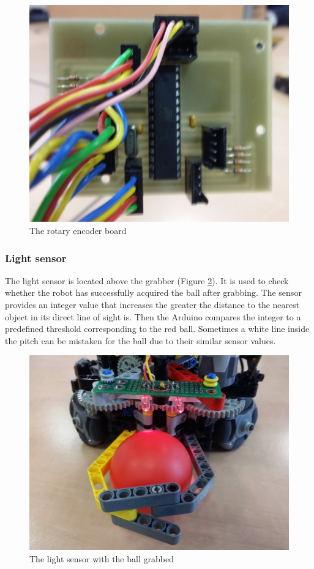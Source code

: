 \documentclass[a4paper,12pt]{article}
\begin{document}
\begin{figure}[ht!]
\centering
\includegraphics[scale=.1]{rotary1}
\caption{The rotary encoder board}
\label{fig:rotary}
\end{figure}

\subsubsection{Light sensor}

The light sensor is located above the grabber (Figure \ref{fig:sensor}). It is used to check whether
the robot has successfully acquired the ball after grabbing. The sensor
provides an integer value that increases the greater the distance to the
nearest object in its direct line of sight is. Then the Arduino compares the integer
to a predefined threshold corresponding to the red ball. Sometimes a white
line inside the pitch can be mistaken for the ball due to their similar sensor
values.

\begin{figure}[ht!]
\centering
\includegraphics[scale=.1]{sensor1}
\caption{The light sensor with the ball grabbed}
\label{fig:sensor}
\end{figure}
\end{document}
